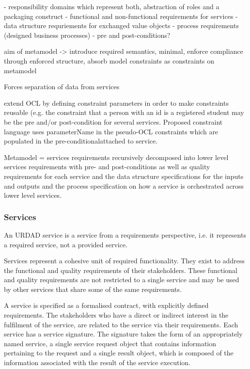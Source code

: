  - responsibility domains which represent both, abstraction of roles and a packaging construct
 - functional and non-functional requirements for services
 - data structure requriements for exchanged value objects
 - process requirements (designed business processes)
 - pre and post-conditions?


aim of metamodel -> introduce required semantics, minimal, enforce compliance through enforced structure, absorb model constraints as constraints on metamodel



Forces separation of data from services

extend OCL by defining constraint parameters  in order to make constraints reusable (e.g. the constraint that a
person with an id is a registered student may be the pre and/or post-condition for several services. Proposed
constraint language uses parameterName in the pseudo-OCL constraints which are populated in the pre-conditionalattached to service.



Metamodel = services requirements recursively decomposed into lower level services requirements with pre- and post-conditions as well as quality requirements for each service and the data structure specifications for the inputs and outputs and the process specification on how a service is orchestrated across lower level services.




\subsubsection{Services}

An URDAD service is a service from a requirements perspective, i.e. it represents a required service, not a provided service. 


Services represent a cohesive unit of required functionality. They exist to address the functional and quality requirements of their stakeholders. These functional and quality requirements are not restricted to a single service and may be used by other services that share some of the same requirements.

A service is specified as a formalised contract, with explicitly defined requirements. The stakeholders who have a direct or indirect interest in the fulfilment of the service, are related to the service via their requirements. Each service has a service signature. The signature takes the form of an appropriately named service, a single service request object that contains information pertaining to the request and a single result object, which is composed of the information associated with the result of the service execution.

